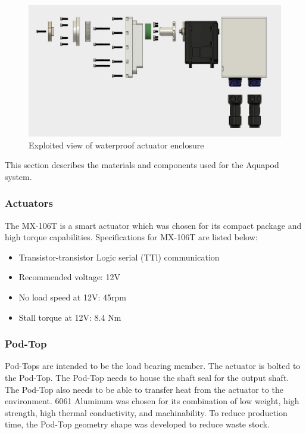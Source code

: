 \begin{figure}[h]
\centering
\includegraphics[width=1.0\columnwidth]{./img/aquaPod-exploded.png}
\caption{Exploited view of waterproof actuator enclosure }
\label{fig:pod exploted}
\end{figure}


This section describes the materials and components used for the Aquapod system.


\subsubsection{Actuators}
The MX-106T is a smart actuator which was chosen for its compact package and high torque capabilities. 
Specifications for MX-106T are listed below: 
\begin{itemize}
    \item Transistor-transistor Logic serial (TTl) communication 
    
    \item Recommended voltage: 12V

    \item No load speed at 12V: 45rpm

    \item Stall torque at 12V: 8.4 Nm

\end{itemize}

\subsubsection{Pod-Top}
Pod-Tops are intended to be the load bearing member. The actuator is bolted to the Pod-Top. The Pod-Top needs to house the shaft seal for the output shaft. The Pod-Top also needs to be able to transfer heat from the actuator to the environment. 
6061 Aluminum was chosen for its combination of low weight, high strength, high thermal conductivity, and machinability. To reduce production time, the Pod-Top geometry shape was developed to reduce waste stock.

